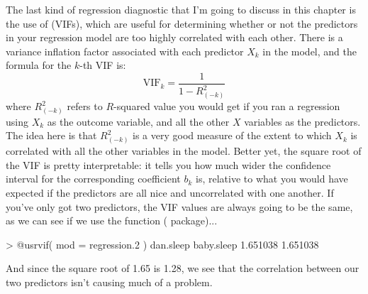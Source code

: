 
%
%

%
%



The last kind of regression diagnostic that I'm going to discuss in this chapter is the use of  (VIFs), which are useful for determining whether or not the predictors in your regression model are too highly correlated with each other. There is a variance inflation factor associated with each predictor $X_k$ in the model, and the formula for the $k$-th VIF is:
$$
\mbox{VIF}_k = \frac{1}{1-{R^2_{(-k)}}}
$$
where $R^2_{(-k)}$ refers to $R$-squared value you would get if you ran a regression using $X_k$ as the outcome variable, and all the other $X$ variables as the predictors. The idea here is that $R^2_{(-k)}$ is a very good measure of the extent to which $X_k$ is correlated with all the other variables in the model. Better yet, the square root of the VIF is pretty interpretable: it tells you how much wider the confidence interval for the corresponding coefficient $b_k$ is, relative to what you would have expected if the predictors are all nice and uncorrelated with one another. If you've only got two predictors, the VIF values are always going to be the same, as we can see if we use the  function ( package)...
\begin{rblock1}
> @usr{vif( mod = regression.2 )}
 dan.sleep baby.sleep 
  1.651038   1.651038 
\end{rblock1}
And since the square root of 1.65 is 1.28, we see that the correlation between our two predictors isn't causing much of a problem. 

